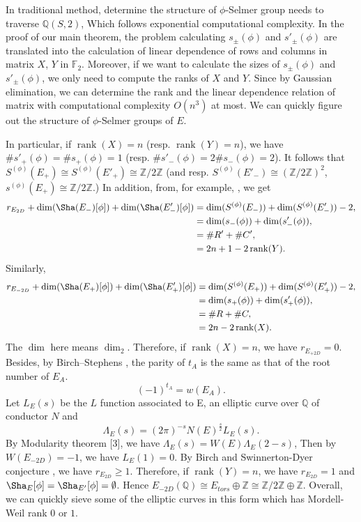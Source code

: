 \documentclass{amsart}
\numberwithin{equation}{section}
\theoremstyle{plain}
\theoremstyle{definition}
\DeclareMathOperator{\rank}{rank}
\newcommand{\FF}{\mathbb F}
\newcommand{\QQ}{\mathbb Q}
\newcommand{\ZZ}{\mathbb Z}
\begin{document}
In traditional method, determine the structure of $\phi$-Selmer group needs to traverse $\QQ(S,2)$, Which follows exponential computational complexity.
In the proof of our main theorem, the problem calculating $s_\pm(\phi)$ and $s'_\pm(\phi)$ are translated into the calculation of linear dependence of rows and columns in matrix $X$, $Y$ in $\FF_2$. Moreover, if we want to calculate the sizes of $s_\pm(\phi)$ and $s'_\pm(\phi)$, we only need to compute the ranks of $X$ and $Y$. Since by Gaussian elimination, we can determine the rank and the linear dependence relation of matrix with computational complexity $O(n^3)$ at most. We can quickly figure out the structure of $\phi$-Selmer groups of $E$.

In particular, if $\rank(X)= n$ (resp. $\rank(Y)= n$), we have $\# s'_+(\phi) = \# s_+(\phi) = 1$ (resp. $\# s'_-(\phi) =2 \# s_-(\phi) = 2$). It follows that $S^{(\phi)}(E_+)\cong S^{({\phi})}({E'_+}) \cong \ZZ/2\ZZ$ (and resp. $S^{({\phi})}({E'_-}) \cong (\ZZ/2\ZZ)^2 $, $s^{(\phi)}(E_+)\cong \ZZ/2\ZZ$.)
In addition, from, for example, \cite{gtm106}, we get
$$
\begin{aligned}
r_{E_{2D}} + \dim(\Sha(E_-)[{\phi}]) + \dim(\Sha(E'_-)[{\phi}]) &= \dim(S^{(\phi)}(E_-)) + \dim(S^{({\phi})}({E'_-})) - 2, \\
&= \dim(s_-(\phi)) + \dim(s'_-(\phi)),\\
&= \# R' + \# C',\\
&= 2n + 1 - 2\rank(Y).
\end{aligned}
$$
Similarly,
$$
\begin{aligned}
r_{E_{-2D}} + \dim(\Sha(E_+)[{\phi}]) + \dim(\Sha(E'_+)[{\phi}]) &= \dim(S^{(\phi)}(E_+)) + \dim(S^{({\phi})}({E'_+})) - 2, \\
&= \dim(s_+(\phi)) + \dim(s'_+(\phi)),\\
&= \# R + \# C,\\
&= 2n  - 2\rank(X).
\end{aligned}
$$
The $\dim$ here means $\dim_2$. Therefore, if $\rank(X) = n$, we have $r_{E_{+2D}} = 0$.
Besides, by Birch–Stephens \cite{parity}, the parity of $t_A$ is the same as that of the root number of $E_A$. 
$$(-1)^{t_A} = w(E_A).$$ 
Let $L_E(s)$ be the $L$ function associated to E, an elliptic curve over $\QQ$ of conductor $N$ and
$$
\Lambda_{E}(s) = (2\pi)^{-s}N(E)^{\frac{s}{2}}L_{E}(s).
$$
By Modularity theorem [3], we have $\Lambda_{E}(s) = W(E)\Lambda_{E}(2-s)$,
Then by $W(E_{-2D}) = -1$, we have $L_E(1) = 0$. By Birch and Swinnerton-Dyer conjecture \cite{gtm106}, we have $r_{E_{2D}} \geq 1$. Therefore, if $\rank(Y) = n$, we have $r_{E_{2D}} = 1$ and $\Sha_{E}[\phi] = \Sha_{E'}[{\phi}] = \emptyset$. Hence $E_{-2D}(\QQ) \cong E_{tors}\oplus\ZZ \cong \ZZ/2\ZZ \oplus \ZZ$.
Overall, we can quickly sieve some of the elliptic curves in this form which has Mordell-Weil rank $0$ or $1$.
\end{document}
